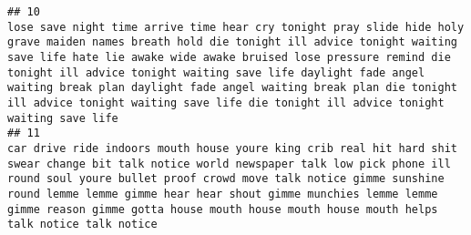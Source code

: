\documentclass[]{article}
\begin{document}
\begin{verbatim}
## 10                                                                                                                                                                                                                                                                                                                                                                                                                                                                                                                                                                                                                                                                                                                                                                                          lose save night time arrive time hear cry tonight pray slide hide holy grave maiden names breath hold die tonight ill advice tonight waiting save life hate lie awake wide awake bruised lose pressure remind die tonight ill advice tonight waiting save life daylight fade angel waiting break plan daylight fade angel waiting break plan die tonight ill advice tonight waiting save life die tonight ill advice tonight waiting save life
## 11                                                                                                                                                                                                                                                                                                                                                                                                                                                                                                                                                                                                                                                                                                                                                                                                                                                            car drive ride indoors mouth house youre king crib real hit hard shit swear change bit talk notice world newspaper talk low pick phone ill round soul youre bullet proof crowd move talk notice gimme sunshine round lemme lemme gimme hear hear shout gimme munchies lemme lemme gimme reason gimme gotta house mouth house mouth house mouth helps talk notice talk notice

\end{verbatim}
\end{document}
